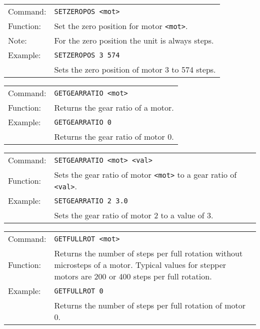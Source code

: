 \vspace{\vdistace}

\begin{table}[h]
  \begin{tabularx}{\textwidth}{lX}
    Command:  & \texttt{SETZEROPOS <mot>}\\
    Function: & Set the zero position for motor \texttt{<mot>}.\\
    Note:     & For the zero position the unit is always steps.\\
    Example:  & \texttt{SETZEROPOS 3 574}\\
              & Sets the zero position of motor 3 to 574 steps.
  \end{tabularx}
\end{table}

\vspace{\vdistace}

\begin{table}[h]
  \begin{tabularx}{\textwidth}{lX}
    Command:  & \texttt{GETGEARRATIO <mot>}\\
    Function: & Returns the gear ratio of a motor.\\
    Example:  & \texttt{GETGEARRATIO 0}\\
              & Returns the gear ratio of motor 0.
  \end{tabularx}
\end{table}

\vspace{\vdistace}

\begin{table}[h]
  \begin{tabularx}{\textwidth}{lX}
    Command:  & \texttt{SETGEARRATIO <mot> <val>}\\
    Function: & Sets the gear ratio of motor \texttt{<mot>} to a gear ratio
                of \texttt{<val>}.\\
    Example:  & \texttt{SETGEARRATIO 2 3.0}\\
              & Sets the gear ratio of motor 2 to a value of 3.
  \end{tabularx}
\end{table}

\vspace{\vdistace}

\begin{table}[h]
  \begin{tabularx}{\textwidth}{lX}
    Command:  & \texttt{GETFULLROT <mot>}\\
    Function: & Returns the number of steps per full rotation without microsteps of a motor. Typical values for stepper motors are 200 or 400 steps per full rotation.\\
    Example:  & \texttt{GETFULLROT 0}\\
              & Returns the number of steps per full rotation of motor 0.
  \end{tabularx}
\end{table}

